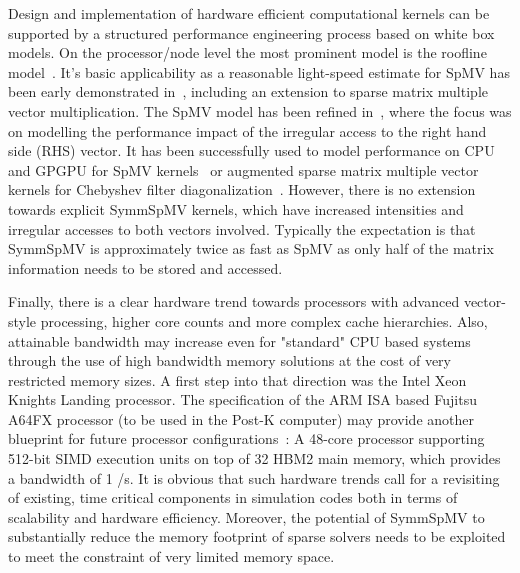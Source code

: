 	
Design and implementation of hardware efficient computational kernels can be supported by a structured performance engineering process based on white box models. On the processor/node level the most prominent model is the roofline model~\cite{Williams_roofline}. It's basic applicability as a reasonable light-speed estimate for \acrshort{SpMV} has been early demonstrated in~\cite{Gropp:1999}, including an extension to sparse matrix multiple vector multiplication. The \acrshort{SpMV} model has been refined in~\cite{Moritz_sell}, where the focus was on modelling the performance impact of the irregular access to the  right hand side (RHS) vector. It has been successfully used to model performance on CPU and GPGPU for \acrshort{SpMV} kernels~\cite{Moritz_sell} or augmented sparse matrix multiple vector kernels for Chebyshev filter diagonalization~\cite{ISC2018:ChebFD}. However, there is no extension towards explicit \acrshort{SymmSpMV} kernels, which have increased intensities and irregular accesses to both vectors involved. Typically the expectation is that \acrshort{SymmSpMV} is approximately twice as fast as \acrshort{SpMV} as only half of the matrix information needs to be stored and accessed. 

Finally, there is a clear hardware trend towards processors with advanced vector-style processing, higher core counts and more complex cache hierarchies. Also, attainable bandwidth may increase even for "standard" CPU based systems through the use of high bandwidth memory solutions at the cost of very restricted memory sizes. A first step into that direction was the Intel Xeon Knights Landing processor. The specification of the ARM ISA based Fujitsu A64FX processor (to be used in the Post-K computer) may provide another blueprint for future processor configurations~\cite{Post-K:Processor}: A 48-core processor supporting 512-bit SIMD execution units on top of 32 \GB HBM2 main memory, which provides a bandwidth of 1 \TB/s.  It is obvious that such hardware trends call for a revisiting of existing, time critical components in simulation codes both in terms of scalability and hardware efficiency. Moreover, the potential of \acrshort{SymmSpMV} to substantially reduce the memory footprint of sparse solvers needs to be exploited to meet the constraint of very limited memory space. 

